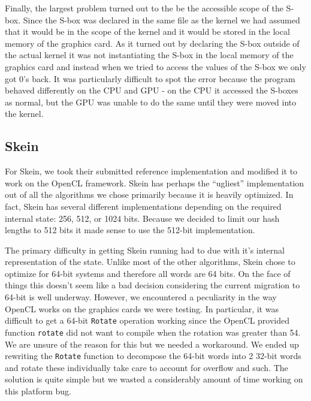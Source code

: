 Finally, the largest problem turned out to the be the accessible scope of the S-box.
Since the S-box was declared in the same file as the kernel we had assumed that it would be in the scope of the kernel and it would be stored in the local memory of the graphics card.
As it turned out by declaring the S-box outside of the actual kernel it was not instantiating the S-box in the local memory of the graphics card and instead when we tried to access the values of the S-box we only got 0's back.
It was particularly difficult to spot the error because the program behaved differently on the CPU and GPU - on the CPU it accessed the S-boxes as normal, but the GPU was unable to do the same until they were moved into the kernel.

\subsection*{Skein}

For Skein, we took their submitted reference implementation and modified it to work on the OpenCL framework.
Skein has perhaps the ``ugliest'' implementation out of all the algorithms we chose primarily because it is heavily optimized.
In fact, Skein has several different implementations depending on the required internal state: 256, 512, or 1024 bits.
Because we decided to limit our hash lengths to 512 bits it made sense to use the 512-bit implementation.

The primary difficulty in getting Skein running had to due with it's internal representation of the state.
Unlike most of the other algorithms, Skein chose to optimize for 64-bit systems and therefore all words are 64 bits.
On the face of things this doesn't seem like a bad decision considering the current migration to 64-bit is well underway.
However, we encountered a peculiarity in the way OpenCL works on the graphics cards we were testing.
In particular, it was difficult to get a 64-bit {\tt Rotate} operation working since the OpenCL provided function {\tt rotate} did not want to compile when the rotation was greater than 54.
We are unsure of the reason for this but we needed a workaround.
We ended up rewriting the {\tt Rotate} function to decompose the 64-bit words into 2 32-bit words and rotate these individually take care to account for overflow and such.
The solution is quite simple but we wasted a considerably amount of time working on this platform bug.
